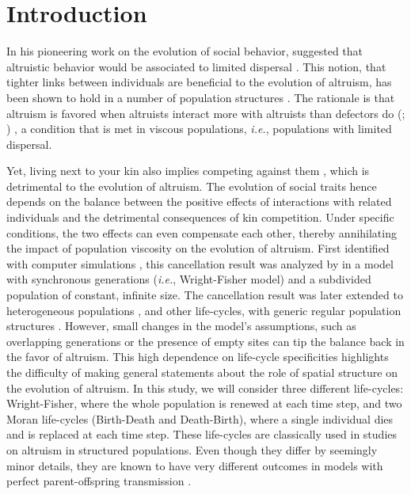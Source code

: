 \documentclass[11pt, letterpaper]{article}
\newcommand{\ie}{\textit{i.e.}}
\newcommand{\eg}{\textit{e.g.}}
\begin{document}
\section*{Introduction}%
In his pioneering work on the evolution of social behavior, \citeauthor{Hamilton1964} suggested that altruistic behavior would be associated to limited dispersal \citep[p.~10]{Hamilton1964}. This notion, that tighter links between individuals are beneficial to the evolution of altruism, has been shown to hold in a number of population structures  \citep[see \eg][]{Ohtsuki2006, TaylorDayWild2007, Lehmann2007, Allen2017}. The rationale is that altruism is favored when altruists interact more with altruists than defectors do (\citealp[p.~141]{Hamilton1975}; \citealp{Fletcher2009})%
, a condition that is met in viscous populations, \ie, populations with limited dispersal.

Yet, living next to your kin also implies competing against them \citep{West2002}, which is detrimental to the evolution of altruism. The evolution of social traits hence depends on the balance between the positive effects of interactions with related individuals and the detrimental consequences of kin competition. Under specific conditions, the two effects can even compensate each other, thereby annihilating the impact of population viscosity on the evolution of altruism. 
First identified with computer simulations \citep{Wilson1992}, this cancellation result was analyzed by \citet{Taylor1992islandmodel} in a model with synchronous generations (\ie, Wright-Fisher model) and a subdivided population of constant, infinite size. The cancellation result was later extended to heterogeneous populations \citep[][with synchronous generations and infinite population size]{RodriguesGardner2012}, and other life-cycles, with generic regular population structures \citep[][with synchronous generations but also with continuous generations and Birth-Death updating]{Taylor2011}. However, small changes in the model's assumptions, such as overlapping generations \citep{TaylorIrwin2000} or the presence of empty sites \citep{Alizon2008} can tip the balance back in the favor of altruism. 
This high dependence on life-cycle specificities highlights the difficulty of making general statements about the role of spatial structure on the evolution of altruism. 
In this study, we will consider three different life-cycles: Wright-Fisher, where the whole population is renewed at each time step, and two Moran life-cycles (Birth-Death and Death-Birth), where a single individual dies and is replaced at each time step. These life-cycles are classically used in studies on altruism in structured populations. Even though they differ by seemingly minor details, they are known to have very different outcomes in models with perfect parent-offspring transmission \citep[\eg,][]{Taylor1992islandmodel, Rousset2004Book,Ohtsuki2006, Lehmann2007, Taylor2010}.    
\end{document}
